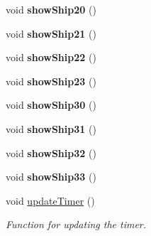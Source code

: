 \begin{DoxyCompactItemize}
void {\bfseries show\+Ship20} ()
\item 
\mbox{\label{classbattleship_a7a8bdac9d5fdab5b9c2f644cbb907f23}} 
void {\bfseries show\+Ship21} ()
\item 
\mbox{\label{classbattleship_a9c6154eb4707452f5198e45d8c8dbd8e}} 
void {\bfseries show\+Ship22} ()
\item 
\mbox{\label{classbattleship_a13de6528e0911afc18408d2b97f9762c}} 
void {\bfseries show\+Ship23} ()
\item 
\mbox{\label{classbattleship_a9ba8dd0642ad8399c773ca9e18b14769}} 
void {\bfseries show\+Ship30} ()
\item 
\mbox{\label{classbattleship_a5773f762c98d1d175b0f22551e478586}} 
void {\bfseries show\+Ship31} ()
\item 
\mbox{\label{classbattleship_aef3cfb89e65bc1b668f72e5c0164fb2c}} 
void {\bfseries show\+Ship32} ()
\item 
\mbox{\label{classbattleship_afaa4f0016271f47183cdd9f48230c9db}} 
void {\bfseries show\+Ship33} ()
\item 
void \hyperlink{classbattleship_ad6e6acff47dd594732ad1606b62a9dbc}{update\+Timer} ()
\begin{DoxyCompactList}\small\item\em Function for updating the timer. \end{DoxyCompactList}\end{DoxyCompactItemize}
